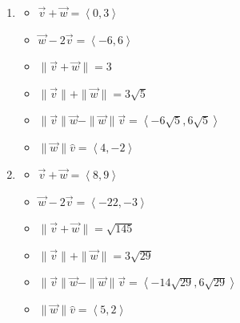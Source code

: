\documentclass{ximera}
\begin{document}
\begin{enumerate}
\begin{itemize}
\end{itemize}

 

\item  

 

\begin{itemize}

\item  $\overrightarrow{v} + \overrightarrow{w} = \left<0,3\right> $ 
\item  $\overrightarrow{w}  - 2\overrightarrow{v}  = \left<-6,6 \right>$ 



\item $\| \overrightarrow{v} + \overrightarrow{w} \| = 3$ 
\item  $\| \overrightarrow{v} \| + \| \overrightarrow{w}\| = 3\sqrt{5}$ 


\item $\| \overrightarrow{v} \| \overrightarrow{w} - \| \overrightarrow{w} \| \overrightarrow{v}  = \left<-6\sqrt{5},6\sqrt{5}\right>$ 
\item $\|\overrightarrow{w}\| \hat{v}= \left<4, -2 \right>$ 

\end{itemize}

 

\item  

 

\begin{itemize}

\item  $\overrightarrow{v} + \overrightarrow{w} = \left<8,9\right> $ 
\item  $\overrightarrow{w}  - 2\overrightarrow{v}  = \left<-22, -3 \right>$ 


\item $\| \overrightarrow{v} + \overrightarrow{w} \| = \sqrt{145}$ 
\item  $\| \overrightarrow{v} \| + \| \overrightarrow{w}\| = 3\sqrt{29}$ 


\item $\| \overrightarrow{v} \| \overrightarrow{w} - \| \overrightarrow{w} \| \overrightarrow{v}  = \left<-14\sqrt{29},6\sqrt{29}\right>$ 
\item $\|\overrightarrow{w}\| \hat{v}= \left<5, 2 \right>$ 

\end{itemize}

 


\end{enumerate}
\end{document}
